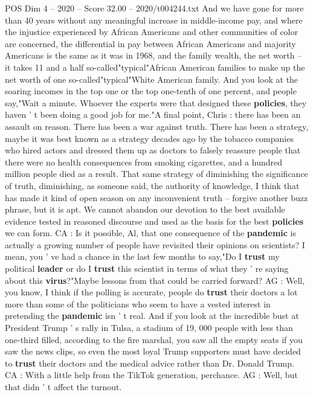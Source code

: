 \begin{textsample}{POS Dim 4 – 2020 – Score 32.00 – 2020/t004244.txt}
And we have gone for more than 40 years without any meaningful increase in middle-income pay, and where the injustice experienced by African Americans and other communities of color are concerned, the differential in pay between African Americans and majority Americans is the same as it was in 1968, and the family wealth, the net worth -- it takes 11 and a half so-called"typical"African American families to make up the net worth of one so-called"typical"White American family.
And you look at the soaring incomes in the top one or the top one-tenth of one percent, and people say,"Wait a minute.
Whoever the experts were that designed these \textbf{policies}, they haven ' t been doing a good job for me."A final point, Chris : there has been an assault on reason.
There has been a war against truth.
There has been a strategy, maybe it was best known as a strategy decades ago by the tobacco companies who hired actors and dressed them up as doctors to falsely reassure people that there were no health consequences from smoking cigarettes, and a hundred million people died as a result.
That same strategy of diminishing the significance of truth, diminishing, as someone said, the authority of knowledge, I think that has made it kind of open season on any inconvenient truth -- forgive another buzz phrase, but it is apt.
We cannot abandon our devotion to the best available evidence tested in reasoned discourse and used as the basis for the best \textbf{policies} we can form.
CA : Is it possible, Al, that one consequence of the \textbf{pandemic} is actually a growing number of people have revisited their opinions on scientists?
I mean, you ' ve had a chance in the last few months to say,"Do I \textbf{trust} my political \textbf{leader} or do I \textbf{trust} this scientist in terms of what they ' re saying about this \textbf{virus}?"Maybe lessons from that could be carried forward?
AG : Well, you know, I think if the polling is accurate, people do \textbf{trust} their doctors a lot more than some of the politicians who seem to have a vested interest in pretending the \textbf{pandemic} isn ' t real.
And if you look at the incredible bust at President Trump ' s rally in Tulsa, a stadium of 19, 000 people with less than one-third filled, according to the fire marshal, you saw all the empty seats if you saw the news clips, so even the most loyal Trump supporters must have decided to \textbf{trust} their doctors and the medical advice rather than Dr.
Donald Trump.
CA : With a little help from the TikTok generation, perchance.
AG : Well, but that didn ' t affect the turnout.

\end{textsample}
